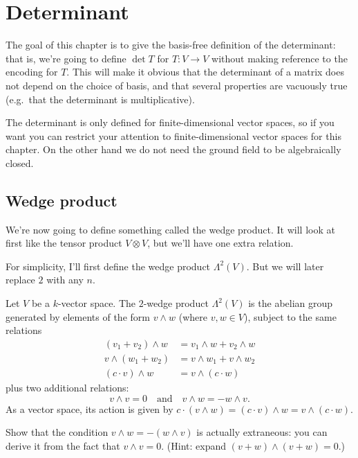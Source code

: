 \chapter{Determinant}
The goal of this chapter is to give the basis-free
definition of the determinant:
that is, we're going to define $\det T$
for $T \colon V \to V$ without making reference to the encoding for $T$.
This will make it obvious that the determinant of a matrix
does not depend on the choice of basis,
and that several properties are vacuously true
(e.g.\ that the determinant is multiplicative).

The determinant is only defined for finite-dimensional
vector spaces, so if you want you can restrict
your attention to finite-dimensional vector spaces for this chapter.
On the other hand we do not need the
ground field to be algebraically closed.

\section{Wedge product}
We're now going to define something called the wedge product.
It will look at first like the tensor product $V \otimes V$,
but we'll have one extra relation.

For simplicity, I'll first define the wedge product $\Lambda^2(V)$.
But we will later replace $2$ with any $n$.

\begin{definition}
	Let $V$ be a $k$-vector space.
	The $2$-wedge product $\Lambda^2(V)$ is the abelian group
	generated by elements of the form $v \wedge w$ (where $v,w \in V$),
	subject to the same relations
	\begin{align*}
		(v_1 + v_2) \wedge w &= v_1 \wedge w + v_2 \wedge w \\
		v \wedge (w_1 + w_2) &= v \wedge w_1 + v \wedge w_2 \\
		(c \cdot v) \wedge w &= v \wedge (c \cdot w)
	\end{align*}
	plus two additional relations:
	\[ v \wedge v = 0 \quad\text{and}\quad
		v \wedge w = - w \wedge v. \]
	As a vector space, its action is given by
	$c \cdot (v \wedge w) = (c \cdot v) \wedge w = v \wedge (c \cdot w)$.
\end{definition}
\begin{exercise}
	Show that the condition $v \wedge w = - (w \wedge v)$
	is actually extraneous:
	you can derive it from the fact that $v \wedge v = 0$.
	(Hint: expand $(v + w) \wedge (v + w) = 0$.)
\end{exercise}

